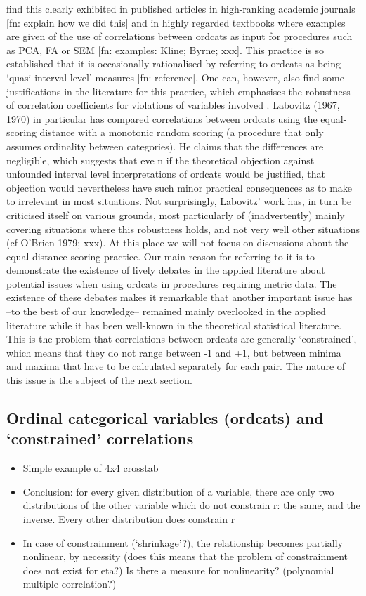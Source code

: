 \documentclass[
  12pt,
]{article}
\providecommand{\tightlist}{%
  \setlength{\itemsep}{0pt}\setlength{\parskip}{0pt}}\usepackage{longtable,booktabs,array}
\theoremstyle{plain}
\theoremstyle{definition}
\theoremstyle{remark}
\begin{document}
find this clearly exhibited in published articles in high-ranking
academic journals {[}fn: explain how we did this{]} and in highly
regarded textbooks where examples are given of the use of correlations
between ordcats as input for procedures such as PCA, FA or SEM {[}fn:
examples: Kline; Byrne; xxx{]}. This practice is so established that it
is occasionally rationalised by referring to ordcats as being
`quasi-interval level' measures {[}fn: reference{]}. One can, however,
also find some justifications in the literature for this practice, which
emphasises the robustness of correlation coefficients for violations of
variables involved . Labovitz (1967, 1970) in particular has compared
correlations between ordcats using the equal-scoring distance with a
monotonic random scoring (a procedure that only assumes ordinality
between categories). He claims that the differences are negligible,
which suggests that eve n if the theoretical objection against unfounded
interval level interpretations of ordcats would be justified, that
objection would nevertheless have such minor practical consequences as
to make to irrelevant in most situations. Not surprisingly, Labovitz'
work has, in turn be criticised itself on various grounds, most
particularly of (inadvertently) mainly covering situations where this
robustness holds, and not very well other situations (cf O'Brien 1979;
xxx). At this place we will not focus on discussions about the
equal-distance scoring practice. Our main reason for referring to it is
to demonstrate the existence of lively debates in the applied literature
about potential issues when using ordcats in procedures requiring metric
data. The existence of these debates makes it remarkable that another
important issue has --to the best of our knowledge-- remained mainly
overlooked in the applied literature while it has been well-known in the
theoretical statistical literature. This is the problem that
correlations between ordcats are generally `constrained', which means
that they do not range between -1 and +1, but between minima and maxima
that have to be calculated separately for each pair. The nature of this
issue is the subject of the next section.

\subsection{Ordinal categorical variables (ordcats) and `constrained'
correlations}\label{ordinal-categorical-variables-ordcats-and-constrained-correlations}

\begin{itemize}
\tightlist
\item
  Simple example of 4x4 crosstab
\item
  Conclusion: for every given distribution of a variable, there are only
  two distributions of the other variable which do not constrain r: the
  same, and the inverse. Every other distribution does constrain r
\item
  In case of constrainment (`shrinkage'?), the relationship becomes
  partially nonlinear, by necessity (does this means that the problem of
  constrainment does not exist for eta?) Is there a measure for
  nonlinearity? (polynomial multiple correlation?)
\end{itemize}
\end{document}
